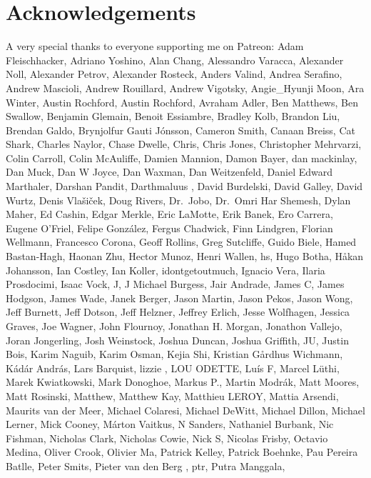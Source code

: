 \documentclass[
  letterpaper,
  DIV=11,
  numbers=noendperiod]{scrartcl}
\begin{document}
\hypertarget{acknowledgements}{%
\section*{Acknowledgements}\label{acknowledgements}}

A very special thanks to everyone supporting me on Patreon: Adam
Fleischhacker, Adriano Yoshino, Alan Chang, Alessandro Varacca,
Alexander Noll, Alexander Petrov, Alexander Rosteck, Anders Valind,
Andrea Serafino, Andrew Mascioli, Andrew Rouillard, Andrew Vigotsky,
Angie\_Hyunji Moon, Ara Winter, Austin Rochford, Austin Rochford,
Avraham Adler, Ben Matthews, Ben Swallow, Benjamin Glemain, Benoit
Essiambre, Bradley Kolb, Brandon Liu, Brendan Galdo, Brynjolfur Gauti
Jónsson, Cameron Smith, Canaan Breiss, Cat Shark, Charles Naylor, Chase
Dwelle, Chris, Chris Jones, Christopher Mehrvarzi, Colin Carroll, Colin
McAuliffe, Damien Mannion, Damon Bayer, dan mackinlay, Dan Muck, Dan W
Joyce, Dan Waxman, Dan Weitzenfeld, Daniel Edward Marthaler, Darshan
Pandit, Darthmaluus , David Burdelski, David Galley, David Wurtz, Denis
Vlašiček, Doug Rivers, Dr.~Jobo, Dr.~Omri Har Shemesh, Dylan Maher, Ed
Cashin, Edgar Merkle, Eric LaMotte, Erik Banek, Ero Carrera, Eugene
O'Friel, Felipe González, Fergus Chadwick, Finn Lindgren, Florian
Wellmann, Francesco Corona, Geoff Rollins, Greg Sutcliffe, Guido Biele,
Hamed Bastan-Hagh, Haonan Zhu, Hector Munoz, Henri Wallen, hs, Hugo
Botha, Håkan Johansson, Ian Costley, Ian Koller, idontgetoutmuch,
Ignacio Vera, Ilaria Prosdocimi, Isaac Vock, J, J Michael Burgess, Jair
Andrade, James C, James Hodgson, James Wade, Janek Berger, Jason Martin,
Jason Pekos, Jason Wong, Jeff Burnett, Jeff Dotson, Jeff Helzner,
Jeffrey Erlich, Jesse Wolfhagen, Jessica Graves, Joe Wagner, John
Flournoy, Jonathan H. Morgan, Jonathon Vallejo, Joran Jongerling, Josh
Weinstock, Joshua Duncan, Joshua Griffith, JU, Justin Bois, Karim
Naguib, Karim Osman, Kejia Shi, Kristian Gårdhus Wichmann, Kádár András,
Lars Barquist, lizzie , LOU ODETTE, Luís F, Marcel Lüthi, Marek
Kwiatkowski, Mark Donoghoe, Markus P., Martin Modrák, Matt Moores, Matt
Rosinski, Matthew, Matthew Kay, Matthieu LEROY, Mattia Arsendi, Maurits
van der Meer, Michael Colaresi, Michael DeWitt, Michael Dillon, Michael
Lerner, Mick Cooney, Márton Vaitkus, N Sanders, Nathaniel Burbank, Nic
Fishman, Nicholas Clark, Nicholas Cowie, Nick S, Nicolas Frisby, Octavio
Medina, Oliver Crook, Olivier Ma, Patrick Kelley, Patrick Boehnke, Pau
Pereira Batlle, Peter Smits, Pieter van den Berg , ptr, Putra Manggala,
\end{document}
